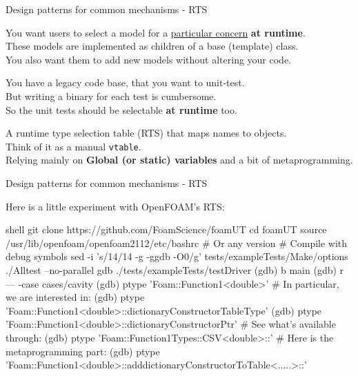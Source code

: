 \begin{frame}[fragile]{Design patterns for common mechanisms - RTS}

\begin{description}
    \item[Scenario 1\hspace{2cm}] \hspace{\linewidth}
        You want users to select a model for a \underline{particular concern} {\bf at runtime}.\\
        These models are implemented as children of a base (template) class.\\
        You also want them to add new models without altering your code.\\
    \item[Scenario 2\hspace{2cm}] \hspace{\linewidth}
        You have a legacy code base, that you want to unit-test.\\
        But writing a binary for each test is cumbersome.\\
        So the unit tests should be selectable {\bf at runtime} too.\\
    \item<2>[Solution\hspace{2cm}] \hspace{\linewidth}
        A runtime type selection table (RTS) that maps names to objects.\\
        Think of it as a manual {\tt vtable}.\\
        Relying mainly on {\bf Global (or static) variables} and a bit of metaprogramming.\\
\end{description}

\end{frame}

\begin{frame}[fragile]{Design patterns for common mechanisms - RTS}

Here is a little experiment with OpenFOAM's RTS:

\begin{CodeEnvNoComment}{shell}{\scriptsize}
git clone https://github.com/FoamScience/foamUT
cd foamUT
source /usr/lib/openfoam/openfoam2112/etc/bashrc # Or any version
# Compile with debug symbols
sed -i 's/14/14 -g -ggdb -O0/g' tests/exampleTests/Make/options
./Alltest --no-parallel
gdb ./tests/exampleTests/testDriver
    (gdb) b main
    (gdb) r --- -case cases/cavity
    (gdb) ptype 'Foam::Function1<double>'
    # In particular, we are interested in:
    (gdb) ptype 'Foam::Function1<double>::dictionaryConstructorTableType'
    (gdb) ptype 'Foam::Function1<double>::dictionaryConstructorPtr'
    # See what's available through:
    (gdb) ptype 'Foam::Function1Types::CSV<double>::'
    # Here is the metaprogramming part:
    (gdb) ptype 'Foam::Function1<double>::adddictionaryConstructorToTable<.....>::'
\end{CodeEnvNoComment}
\end{frame}

